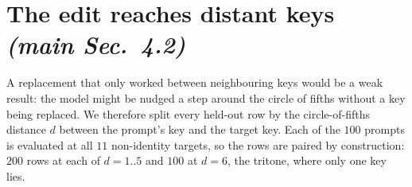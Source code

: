 \documentclass{article}
\begin{document}
\section{The edit reaches distant keys \normalfont\textit{(main Sec.~4.2)}}
\label{sec:distance}
%

A replacement that only worked between neighbouring keys would be a weak result: the
model might be nudged a step around the circle of fifths without a key being
replaced. We therefore split every held-out row by the circle-of-fifths distance $d$
between the prompt's key and the target key. Each of the $100$ prompts is evaluated
at all $11$ non-identity targets, so the rows are paired by construction: $200$ rows at
each of $d=1..5$ and $100$ at $d=6$, the tritone, where only one key lies.
\end{document}
